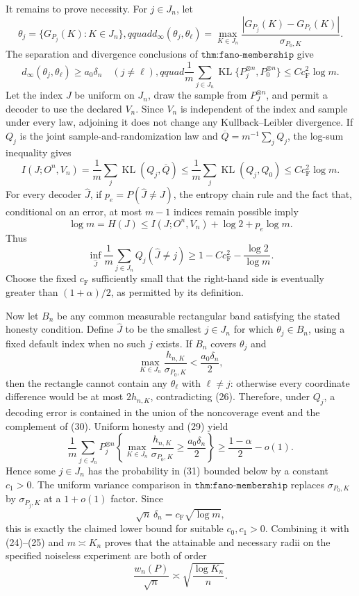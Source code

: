 It remains to prove necessity.  For \(j\in J_n\), let
\[
 \theta_j=\{G_{P_j}(K):K\in J_n\},qquad
 d_\infty(\theta_j,\theta_\ell)
 =\max_{K\in J_n}
 \frac{|G_{P_j}(K)-G_{P_\ell}(K)|}{\sigma_{P_0,K}}.
\]
The separation and divergence conclusions of \(\texttt{thm:fano-membership}\) give
\[
 d_\infty(\theta_j,\theta_\ell)\geq a_0\delta_n
 \quad(j\ne\ell),qquad
 \frac1m\sum_{j\in J_n}
 \operatorname{KL}\{P_j^{\otimes n},P_0^{\otimes n}\}
 \leq Cc_{\mathrm F}^2\log m.
 \tag{26}
\]
Let the index \(J\) be uniform on \(J_n\), draw the sample from \(P_J^{\otimes n}\), and permit a decoder to use the declared \(V_n\).  Since \(V_n\) is independent of the index and sample under every law, adjoining it does not change any Kullback--Leibler divergence.  If \(Q_j\) is the joint sample-and-randomization law and \(\overline Q=m^{-1}\sum_jQ_j\), the log-sum inequality gives
\[
 I(J;O^n,V_n)
 =\frac1m\sum_j\operatorname{KL}(Q_j,\overline Q)
 \leq\frac1m\sum_j\operatorname{KL}(Q_j,Q_0)
 \leq Cc_{\mathrm F}^2\log m.
 \tag{27}
\]
For every decoder \(\widehat J\), if \(p_e=P(\widehat J\ne J)\), the entropy chain rule and the fact that, conditional on an error, at most \(m-1\) indices remain possible imply
\[
 \log m=H(J)
 \leq I(J;O^n,V_n)+\log2+p_e\log m.
 \tag{28}
\]
Thus
\[
 \inf_{\widehat J}\frac1m\sum_{j\in J_n}Q_j(\widehat J\ne j)
 \geq1-Cc_{\mathrm F}^2-\frac{\log2}{\log m}.
 \tag{29}
\]
Choose the fixed \(c_{\mathrm F}\) sufficiently small that the right-hand side is eventually greater than \((1+\alpha)/2\), as permitted by its definition.

Now let \(B_n\) be any common measurable rectangular band satisfying the stated honesty condition.  Define \(\widehat J\) to be the smallest \(j\in J_n\) for which \(\theta_j\in B_n\), using a fixed default index when no such \(j\) exists.  If \(B_n\) covers \(\theta_j\) and
\[
 \max_{K\in J_n}\frac{h_{n,K}}{\sigma_{P_0,K}}
 <\frac{a_0\delta_n}{2},
 \tag{30}
\]
then the rectangle cannot contain any \(\theta_\ell\) with \(\ell\ne j\): otherwise every coordinate difference would be at most \(2h_{n,K}\), contradicting (26).  Therefore, under \(Q_j\), a decoding error is contained in the union of the noncoverage event and the complement of (30).  Uniform honesty and (29) yield
\[
 \frac1m\sum_{j\in J_n}
 P_j^{\otimes n}\!\left\{
 \max_{K\in J_n}\frac{h_{n,K}}{\sigma_{P_0,K}}
 \geq\frac{a_0\delta_n}{2}\right\}
 \geq \frac{1-\alpha}{2}-o(1).
 \tag{31}
\]
Hence some \(j\in J_n\) has the probability in (31) bounded below by a constant \(c_1>0\).  The uniform variance comparison in \(\texttt{thm:fano-membership}\) replaces \(\sigma_{P_0,K}\) by \(\sigma_{P_j,K}\) at a \(1+o(1)\) factor.  Since
\[
 \sqrt n\,\delta_n=c_{\mathrm F}\sqrt{\log m},
\]
this is exactly the claimed lower bound for suitable \(c_0,c_1>0\).  Combining it with (24)--(25) and \(m\asymp K_n\) proves that the attainable and necessary radii on the specified noiseless experiment are both of order
\[
 \frac{w_n(P)}{\sqrt n}\asymp\sqrt{\frac{\log K_n}{n}}.
\]